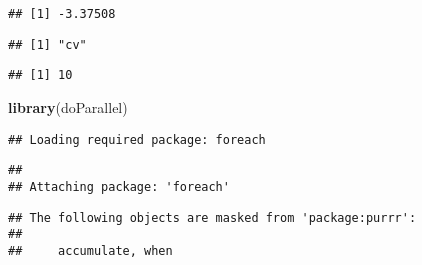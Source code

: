 \documentclass[
]{article}
\newenvironment{Shaded}{\begin{snugshade}}{\end{snugshade}}
\newcommand{\DataTypeTok}[1]{\textcolor[rgb]{0.13,0.29,0.53}{#1}}
\newcommand{\DecValTok}[1]{\textcolor[rgb]{0.00,0.00,0.81}{#1}}
\newcommand{\KeywordTok}[1]{\textcolor[rgb]{0.13,0.29,0.53}{\textbf{#1}}}
\newcommand{\NormalTok}[1]{#1}
\newcommand{\OperatorTok}[1]{\textcolor[rgb]{0.81,0.36,0.00}{\textbf{#1}}}
\newcommand{\OtherTok}[1]{\textcolor[rgb]{0.56,0.35,0.01}{#1}}
\newcommand{\StringTok}[1]{\textcolor[rgb]{0.31,0.60,0.02}{#1}}
\begin{document}
\begin{verbatim}
## [1] -3.37508
\end{verbatim}

\begin{Shaded}
\end{Shaded}

\begin{verbatim}
## [1] "cv"
\end{verbatim}

\begin{Shaded}
\end{Shaded}

\begin{verbatim}
## [1] 10
\end{verbatim}

\begin{Shaded}
\begin{Highlighting}[]
\KeywordTok{library}\NormalTok{(doParallel)}
\end{Highlighting}
\end{Shaded}

\begin{verbatim}
## Loading required package: foreach
\end{verbatim}

\begin{verbatim}
## 
## Attaching package: 'foreach'
\end{verbatim}

\begin{verbatim}
## The following objects are masked from 'package:purrr':
## 
##     accumulate, when
\end{verbatim}
\end{document}
